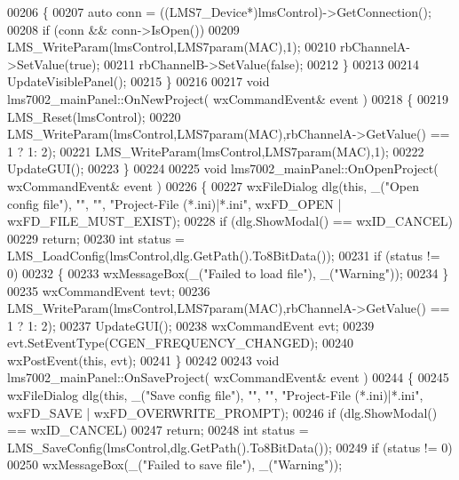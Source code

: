 \begin{DoxyCode}
00206     \{
00207         \textcolor{keyword}{auto} conn = ((LMS7_Device*)lmsControl)->GetConnection();
00208         \textcolor{keywordflow}{if} (conn && conn->IsOpen())
00209             LMS_WriteParam(lmsControl,LMS7param(MAC),1);
00210         rbChannelA->SetValue(\textcolor{keyword}{true});
00211         rbChannelB->SetValue(\textcolor{keyword}{false});
00212     \}
00213 
00214     UpdateVisiblePanel();
00215 \}
00216 
00217 \textcolor{keywordtype}{void} lms7002_mainPanel::OnNewProject( wxCommandEvent& event )
00218 \{
00219     LMS_Reset(lmsControl);
00220     LMS_WriteParam(lmsControl,LMS7param(MAC),rbChannelA->GetValue() == 1 ? 1: 2);
00221     LMS_WriteParam(lmsControl,LMS7param(MAC),1);
00222     UpdateGUI();
00223 \}
00224 
00225 \textcolor{keywordtype}{void} lms7002_mainPanel::OnOpenProject( wxCommandEvent& event )
00226 \{
00227     wxFileDialog dlg(\textcolor{keyword}{this}, \_(\textcolor{stringliteral}{"Open config file"}), \textcolor{stringliteral}{""}, \textcolor{stringliteral}{""}, \textcolor{stringliteral}{"Project-File (*.ini)|*.ini"}, wxFD\_OPEN | 
      wxFD\_FILE\_MUST\_EXIST);
00228     \textcolor{keywordflow}{if} (dlg.ShowModal() == wxID\_CANCEL)
00229         \textcolor{keywordflow}{return};
00230     \textcolor{keywordtype}{int} status = LMS_LoadConfig(lmsControl,dlg.GetPath().To8BitData());
00231     \textcolor{keywordflow}{if} (status != 0)
00232     \{
00233         wxMessageBox(\_(\textcolor{stringliteral}{"Failed to load file"}), \_(\textcolor{stringliteral}{"Warning"}));
00234     \}
00235     wxCommandEvent tevt;
00236     LMS_WriteParam(lmsControl,LMS7param(MAC),rbChannelA->GetValue() == 1 ? 1: 2);
00237     UpdateGUI();
00238     wxCommandEvent evt;
00239     evt.SetEventType(CGEN\_FREQUENCY\_CHANGED);
00240     wxPostEvent(\textcolor{keyword}{this}, evt);
00241 \}
00242 
00243 \textcolor{keywordtype}{void} lms7002_mainPanel::OnSaveProject( wxCommandEvent& event )
00244 \{
00245     wxFileDialog dlg(\textcolor{keyword}{this}, \_(\textcolor{stringliteral}{"Save config file"}), \textcolor{stringliteral}{""}, \textcolor{stringliteral}{""}, \textcolor{stringliteral}{"Project-File (*.ini)|*.ini"}, wxFD\_SAVE | 
      wxFD\_OVERWRITE\_PROMPT);
00246     \textcolor{keywordflow}{if} (dlg.ShowModal() == wxID\_CANCEL)
00247         \textcolor{keywordflow}{return};
00248     \textcolor{keywordtype}{int} status = LMS_SaveConfig(lmsControl,dlg.GetPath().To8BitData());
00249     \textcolor{keywordflow}{if} (status != 0)
00250         wxMessageBox(\_(\textcolor{stringliteral}{"Failed to save file"}), \_(\textcolor{stringliteral}{"Warning"}));

\end{DoxyCode}
